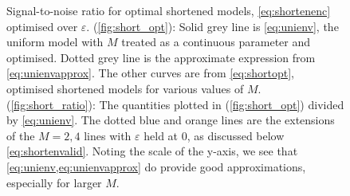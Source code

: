 \documentclass[12pt]{article}
\begin{document}
\begin{figure}[ht]
\begin{center}
\begin{myenuma}
  \item\label{fig:short_opt}
  \item\label{fig:short_ratio}
\end{myenuma}
\caption[Signal-to-noise ratio for optimal shortened models]
{Signal-to-noise ratio for optimal shortened models, \cref{eq:shortenenc} optimised over \(\varepsilon\).
(\ref{fig:short_opt}): Solid grey line is \cref{eq:unienv}, the uniform model with \(M\) treated as a continuous parameter and optimised.
Dotted grey line is the approximate expression from \cref{eq:unienvapprox}.
The other curves are from \cref{eq:shortopt}, optimised shortened models for various values of \(M\).
(\ref{fig:short_ratio}): The quantities plotted in (\ref{fig:short_opt}) divided by \cref{eq:unienv}.
The dotted blue and orange lines are the extensions of the \(M=2,4\) lines with \(\varepsilon\) held at 0, as discussed below \cref{eq:shortenvalid}.
Noting the scale of the y-axis, we see that \cref{eq:unienv,eq:unienvapprox} do provide good approximations, especially for larger \(M\).
\label{fig:shorten}}
\end{center}
\end{figure}
\end{document}
